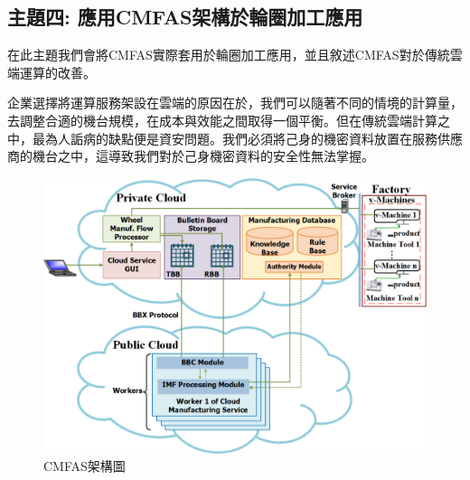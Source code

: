 \documentclass[CJK,12pt,t]{article}
\begin{document}
\begin{CJK*}{UTF8}{bkai}   %






\section{主題四: 應用CMFAS架構於輪圈加工應用}
 
		在此主題我們會將CMFAS實際套用於輪圈加工應用，並且敘述CMFAS對於傳統雲端運算的改善。
		
		企業選擇將運算服務架設在雲端的原因在於，我們可以隨著不同的情境的計算量，去調整合適的機台規模，在成本與效能之間取得一個平衡。但在傳統雲端計算之中，最為人詬病的缺點便是資安問題。我們必須將己身的機密資料放置在服務供應商的機台之中，這導致我們對於己身機密資料的安全性無法掌握。

		\begin{figure}[ht]
			\begin{center}
				\includegraphics[scale=0.5]{figs/CASE2015.png}
				\caption{CMFAS架構圖}
				\label{cmfas1}
			\end{center}
		\end{figure}


\end{CJK*}
\end{document}
